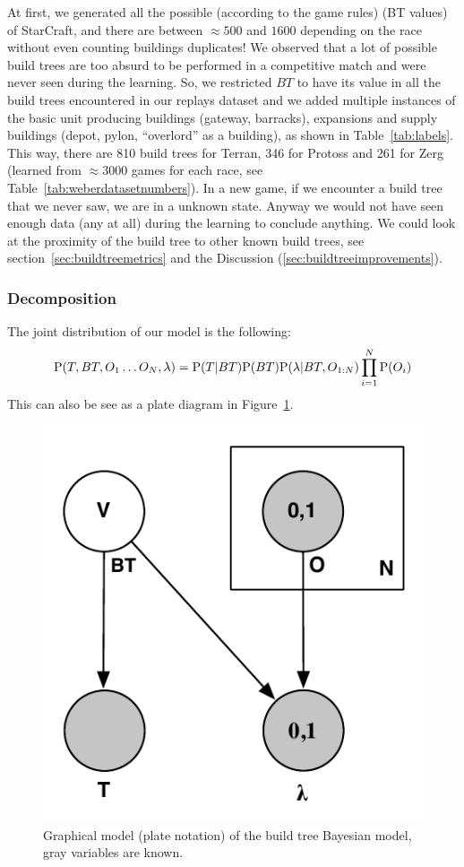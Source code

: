 At first, we generated all the possible (according to the game rules)  (BT values) of StarCraft, and there are between $\approx 500$ and $1600$ depending on the race without even counting buildings duplicates! We observed that a lot of possible build trees are too absurd to be performed in a competitive match and were never seen during the learning. So, we restricted $BT$ to have its value in all the build trees encountered in our replays dataset and we added multiple instances of the basic unit producing buildings (gateway, barracks), expansions and supply buildings (depot, pylon, ``overlord'' as a building), as shown in Table~\ref{tab:labels}. 
This way, there are 810 build trees for Terran, 346 for Protoss and 261 for Zerg (learned from $\approx 3000$ games for each race, see Table~\ref{tab:weberdatasetnumbers}). In a new game, if we encounter a build tree that we never saw, we are in a unknown state. Anyway we would not have seen enough data (any at all) during the learning to conclude anything. We could look at the proximity of the build tree to other known build trees, see section~\ref{sec:buildtreemetrics} and the Discussion (\ref{sec:buildtreeimprovements}).

\subsubsection{Decomposition}
The joint distribution of our model is the following:
\begin{equation}
\mathrm{P}(T, BT, O_1 \dots O_N, \lambda) = \mathrm{P}(T | BT)\mathrm{P}(BT) \mathrm{P}(\lambda | BT, O_{1:N})\prod_{i=1}^{N}\mathrm{P}(O_{i}) 
\end{equation}
This can also be see as a plate diagram in Figure~\ref{fig:buildtreeplate}.

\begin{figure}[h]
\begin{center}
\includegraphics[width=0.38\columnwidth]{images/BuildTreePrediction_plate.pdf}
\end{center}
\caption{Graphical model (plate notation) of the build tree Bayesian model, gray variables are known.}
\label{fig:buildtreeplate}
\end{figure}

